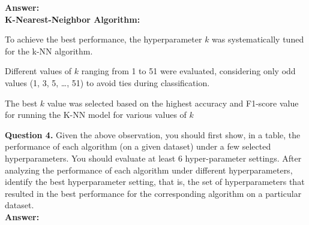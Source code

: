 \documentclass{article}
\begin{document}
\noindent \textbf{Answer:}\\

\vspace{0.3cm}
\textbf{K-Nearest-Neighbor Algorithm:}

\vspace{0.3cm}

To achieve the best performance, the hyperparameter $k$ was systematically tuned for the k-NN algorithm.

Different values of $k$ ranging from 1 to 51 were evaluated, considering only odd values (1, 3, 5, \ldots, 51) to avoid ties during classification.

The best $k$ value was selected based on the highest accuracy and F1-score value for running the K-NN model for various values of $k$
\\

\vspace{0.3cm}

\noindent \textbf{Question 4.} Given the above observation, you should first show, in a table, the performance of each algorithm (on a given dataset) under a few selected hyperparameters. You should evaluate at least 6 hyper-parameter settings. After analyzing the performance of each algorithm under different hyperparameters, identify the best hyperparameter setting, that is, the set of hyperparameters that resulted in the best performance for the corresponding algorithm on a particular dataset.\\

\vspace{0.3cm}
\noindent \textbf{Answer:}\\

\vspace{0.3cm}
\end{document}

